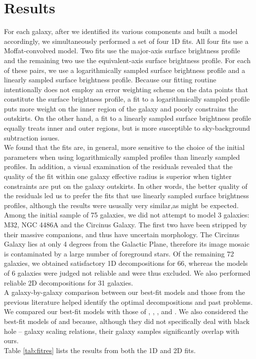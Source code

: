 \documentclass[preprint2]{emulateapj}
\begin{document}
\section{Results}
\label{sec:res}
For each galaxy, after we identified its various components and built a model accordingly, 
we simultaneously performed a set of four 1D fits.
All four fits use a Moffat-convolved model.
Two fits use the major-axis surface brightness profile and the remaining two use the equivalent-axis surface brightness profile. 
For each of these pairs, we use a logarithmically sampled surface brightness profile 
and a linearly sampled surface brightness profile. 
Because our fitting routine intentionally does not employ an error weighting scheme on the data points that constitute the surface brightness profile, 
a fit to a logarithmically sampled profile puts more weight on the inner region of the galaxy 
and poorly constrains the outskirts.
On the other hand, a fit to a linearly sampled surface brightness profile equally treats inner and outer regions, 
but is more susceptible to sky-background subtraction issues. \\ 
We found that the fits are, in general, more sensitive to the choice of the initial parameters 
when using logarithmically sampled profiles than linearly sampled profiles. 
In addition, a visual examination of the residuals revealed that the quality of the fit within one galaxy effective radius 
is superior when tighter constraints are put on the galaxy outskirts.
In other words, the better quality of the residuals led us to prefer the fits that use linearly sampled surface brightness profiles,
although the results were ususally very similar,as might be expected. \\
Among the initial sample of 75 galaxies, we did not attempt to model 3 galaxies: M32, NGC 4486A and the Circinus Galaxy. 
The first two have been stripped by their massive companions, and thus have uncertain morphology. 
The Circinus Galaxy lies at only 4 degrees from the Galactic Plane, 
therefore its image mosaic is contaminated by a large number of foreground stars.
Of the remaining 72 galaxies, 
we obtained satisfactory 1D decompositions for 66, 
whereas the models of 6 galaxies were judged not reliable and were thus excluded. 
We also performed reliable 2D decompositions for 31 galaxies. \\
A galaxy-by-galaxy comparison between our best-fit models and those from the previous literature 
helped identify the optimal decompositions and past problems. 
We compared our best-fit models with those of \cite{grahamdriver2007}, \cite{sani2011}, \cite{beifiori2012}, 
\cite{vika2012} and \cite{lasker2014data}. 
We also considered the best-fit models of \cite{laurikainen2010} and \cite{rusli2013} because,   
although they did not specifically deal with black hole -- galaxy scaling relations, 
their galaxy samples significantly overlap with ours. \\
Table \ref{tab:fitres} lists the results from both the 1D and 2D fits.
\end{document}
